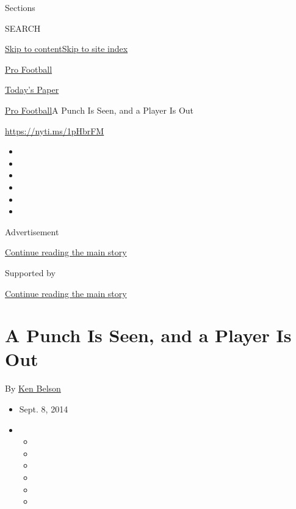 Sections

SEARCH

\protect\hyperlink{site-content}{Skip to
content}\protect\hyperlink{site-index}{Skip to site index}

\href{https://www.nytimes3xbfgragh.onion/section/sports/football}{Pro
Football}

\href{https://myaccount.nytimes3xbfgragh.onion/auth/login?response_type=cookie\&client_id=vi}{}

\href{https://www.nytimes3xbfgragh.onion/section/todayspaper}{Today's
Paper}

\href{/section/sports/football}{Pro Football}\textbar{}A Punch Is Seen,
and a Player Is Out

\url{https://nyti.ms/1pHbrFM}

\begin{itemize}
\item
\item
\item
\item
\item
\item
\end{itemize}

Advertisement

\protect\hyperlink{after-top}{Continue reading the main story}

Supported by

\protect\hyperlink{after-sponsor}{Continue reading the main story}

\hypertarget{a-punch-is-seen-and-a-player-is-out}{%
\section{A Punch Is Seen, and a Player Is
Out}\label{a-punch-is-seen-and-a-player-is-out}}

By \href{http://www.nytimes3xbfgragh.onion/by/ken-belson}{Ken Belson}

\begin{itemize}
\item
  Sept. 8, 2014
\item
  \begin{itemize}
  \item
  \item
  \item
  \item
  \item
  \item
  \end{itemize}
\end{itemize}

